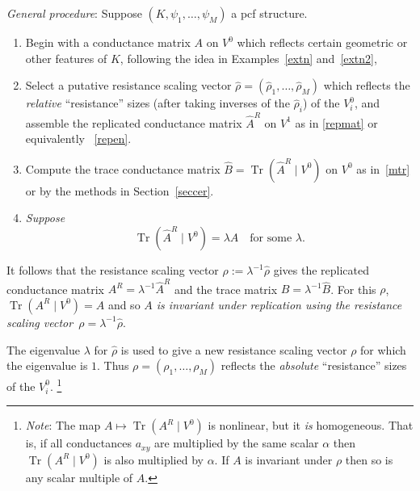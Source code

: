 \documentclass[a4paper]{amsart}
\theoremstyle{plain}
\theoremstyle{definition}
\theoremstyle{remark}
\DeclareMathOperator{\Tr}{Tr}
\begin{document}
\bigskip \noindent  \emph{General procedure}: Suppose $ (K,\psi_1,\dots,\psi_M ) $ a pcf structure.
\begin{enumerate}

\item Begin with a conductance matrix $ A $ on $ V^{0} $ which reflects certain geometric or other features of $ K $, following the idea  in Examples~\ref{extn} and~\ref{extn2},   

\item Select   a putative resistance scaling vector $\widehat{\rho} = (\widehat{\rho}_1 ,\dots, \widehat{\rho}_M) $ which reflects the \emph{relative} ``resistance'' sizes (after taking inverses of the $\widehat{\rho}_i $) of the $ V_i^{0} $,   and assemble  the replicated conductance matrix $ \widehat{A}^R $ on $ V^{1} $ as in \eqref{repmat} or equivalently~ \eqref{repen}.  

\item Compute the trace conductance matrix $ \widehat{B} = \Tr (\widehat{A}^R\mid V^{0}) $ on $ V^{0} $   as in~\eqref{mtr} or by the methods in Section~\ref{seccer}.

\item \emph{Suppose} 
\begin{equation} \label{nle} 
 \Tr (\widehat{A}^R\mid V^{0}) = \lambda A \quad \text{for some } \lambda . 
\end{equation} 
\end{enumerate} 

It follows that the resistance scaling vector $ \rho  := \lambda ^{-1}\widehat{\rho} $   gives the replicated conductance matrix $ A^R = \lambda ^{-1}\widehat{A}^R$ and the trace matrix $ B = \lambda ^{-1} \widehat{B} $. 
For this $ \rho $, $    \Tr (A^R\mid V^{0}) = A$  and so  \emph{$ A $ is invariant under replication using the resistance scaling vector~$ \rho =  \lambda ^{-1}\widehat{\rho}$}.

The eigenvalue $ \lambda  $ for $ \widehat{\rho} $ is used  to give a new resistance scaling vector $ \rho $ for which the eigenvalue is $ 1$.  Thus $ \rho = (\rho_1,\dots, \rho_M) $ reflects the \emph{absolute} ``resistance'' sizes of the $ V_i^{0} $.%
\footnote{\emph{Note}:  The map $ A \mapsto  \Tr (A^R\mid V^{0})$ is nonlinear, but it \emph{is} homogeneous.  That is, if all conductances $ a_{xy} $ are multiplied by the same scalar $ \alpha $ then $ \Tr (A^R\mid V^{0})$ is also multiplied by $ \alpha$.
If $ A $ is invariant under $ \rho $ then so is any scalar multiple of $ A $.}    
\end{document}
